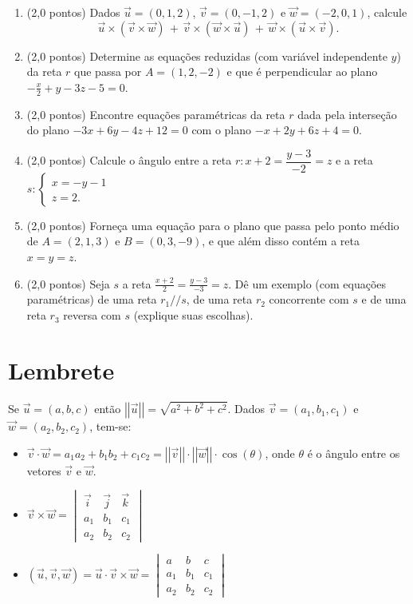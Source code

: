 \documentclass[12pt,a4paper]{article}
\newcommand{\norm}[1]{\left|\left|{#1}\right|\right|}
\begin{document}
\begin{enumerate}
\item (2,0 pontos) Dados $\vec{u}=(0,1,2)$, $\vec{v}=(0,-1,2)$ e $\vec{w}=(-2,0,1)$, calcule
\[
  \vec{u} \times (\vec{v} \times \vec{w}) \, + \,
  \vec{v} \times (\vec{w} \times \vec{u}) \, + \,
  \vec{w} \times (\vec{u} \times \vec{v}).
\]
\item (2,0 pontos) Determine as equações reduzidas (com variável independente $y$) da reta $r$ que passa por $A = (1,2,-2)$ e que é perpendicular ao plano $-\frac{x}{2} + y - 3z - 5 = 0$.

\item (2,0 pontos) Encontre equações paramétricas da reta $r$ dada pela interseção do plano $-3x + 6y - 4z + 12 = 0$ com o plano $-x + 2y + 6z + 4 = 0$.


\item (2,0 pontos) Calcule o ângulo entre a reta $r: x+2 = \dfrac{y-3}{-2} = z$ e a reta $s : \begin{cases}
x = -y -1 \\
z = 2.
\end{cases}$

\item (2,0 pontos) Forneça uma equação para o plano que passa pelo ponto médio de $A = (2, 1, 3)$ e $B = (0, 3, -9)$, e que além disso contém a reta $x = y = z$.

\item (2,0 pontos) Seja $s$ a reta $\frac{x + 2}{2} = \frac{y - 3}{-3} = z$. Dê um exemplo (com equações paramétricas) de uma reta $r_1 // s$, de uma reta $r_2$ concorrente com $s$ e de uma reta $r_3$ reversa com $s$ (explique suas escolhas).
\end{enumerate}

\section*{Lembrete}
Se $\vec{u} = (a,b,c)$ então $\norm{\vec{u}} = \sqrt{a^2 + b^2 + c^2}$. Dados $\vec{v} = (a_1, b_1, c_1)$ e $\vec{w} = (a_2, b_2, c_2)$, tem-se:
\begin{itemize}
\item $\vec{v} \cdot \vec{w}
= a_1 a_2 + b_1 b_2 + c_1 c_2
= \norm{\vec{v}} \cdot \norm{\vec{w}} \cdot \cos(\theta)
$, onde $\theta$ é o ângulo entre os vetores $\vec{v}$ e $\vec{w}$.
\item $\vec{v} \times \vec{w}
= \begin{vmatrix}
\vec{i} & \vec{j} & \vec{k} \\
a_1 & b_1 & c_1\\
a_2 & b_2 & c_2
\end{vmatrix}$
\item $(\vec{u}, \vec{v}, \vec{w})
= \vec{u} \cdot \vec{v} \times \vec{w}
= \begin{vmatrix}
a   & b   & c \\
a_1 & b_1 & c_1 \\
a_2 & b_2 & c_2
\end{vmatrix}$
\end{itemize}
\newpage
\restoregeometry
\end{document}
